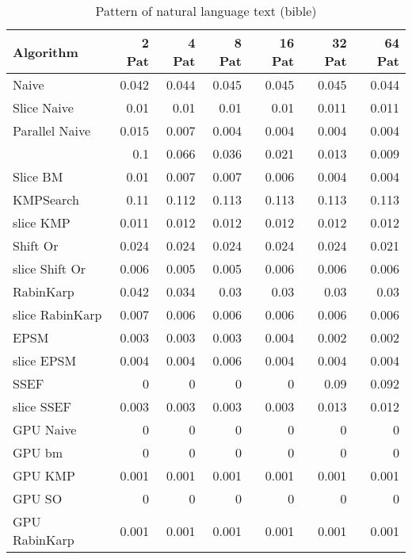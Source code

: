 \documentclass[11pt]{article}       %
\begin{document}
\begin{table}[htbp]
  \centering
  \caption{Pattern of natural language text (bible)}
    \begin{tabular}{lrrrrrr}\label{t1}
Algorithm & 2 Pat & 4 Pat & 8 Pat & 16 Pat & 32 Pat & 64 Pat \\
 \hline
    Naive & 0.042 & 0.044 & 0.045 & 0.045 & 0.045 & 0.044 \\
    Slice Naive & 0.01  & 0.01  & 0.01  & 0.01  & 0.011 & 0.011 \\
    Parallel Naive & 0.015 & 0.007 & 0.004 & 0.004 & 0.004 & 0.004 \\
    {Boyer-Moore & 0.1   & 0.066 & 0.036 & 0.021 & 0.013 & 0.009 \\
    Slice BM & 0.01  & 0.007 & 0.007 & 0.006 & 0.004 & 0.004 \\
    KMPSearch & 0.11  & 0.112 & 0.113 & 0.113 & 0.113 & 0.113 \\
    slice KMP & 0.011 & 0.012 & 0.012 & 0.012 & 0.012 & 0.012 \\
    Shift Or & 0.024 & 0.024 & 0.024 & 0.024 & 0.024 & 0.021 \\
    slice Shift Or & 0.006 & 0.005 & 0.005 & 0.006 & 0.006 & 0.006 \\
    RabinKarp & 0.042 & 0.034 & 0.03  & 0.03  & 0.03  & 0.03 \\
    slice RabinKarp & 0.007 & 0.006 & 0.006 & 0.006 & 0.006 & 0.006 \\
    EPSM  & 0.003 & 0.003 & 0.003 & 0.004 & 0.002 & 0.002 \\
    slice EPSM & 0.004 & 0.004 & 0.006 & 0.004 & 0.004 & 0.004 \\
    SSEF  & 0     & 0     & 0     & 0     & 0.09  & 0.092 \\
    slice SSEF & 0.003 & 0.003 & 0.003 & 0.003 & 0.013 & 0.012 \\
    GPU Naive & 0     & 0     & 0     & 0     & 0     & 0 \\
    GPU bm & 0     & 0     & 0     & 0     & 0     & 0 \\
    GPU KMP & 0.001 & 0.001 & 0.001 & 0.001 & 0.001 & 0.001 \\
    GPU SO & 0     & 0     & 0     & 0     & 0     & 0 \\
    GPU RabinKarp & 0.001 & 0.001 & 0.001 & 0.001 & 0.001 & 0.001 \\
    \end{tabular}%
  \label{tab:addlabel}%
\end{table}%
\end{document}
